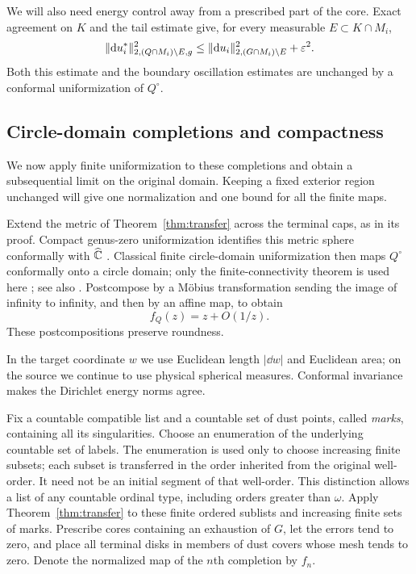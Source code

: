 We will also need energy control away from a prescribed part of the
core.  Exact agreement on $K$ and the tail estimate give, for every
measurable $E\subset K\cap M_i$,
\begin{equation}\label{eq:transfer-localized-energy}
 \|\mathrm d u_i^*\|_{2,(Q\cap M_i)\setminus E,g}^2
 \le \|\mathrm d u_i\|_{2,(G\cap M_i)\setminus E}^2+\varepsilon^2.
\end{equation}
Both this estimate and the boundary oscillation estimates are unchanged
by a conformal uniformization of $Q^\circ$.

\subsection{Circle-domain completions and compactness}

We now apply finite uniformization to these completions and obtain a
subsequential limit on the original domain.  Keeping a fixed exterior
region unchanged will give one normalization and one bound for all
the finite maps.

Extend the metric of Theorem~\ref{thm:transfer} across the terminal
caps, as in its proof.  Compact genus-zero uniformization identifies
this metric sphere conformally with $\widehat{\mathbb C}$
\cite[Theorem~10-3]{Ahlfors1973}.  Classical finite
circle-domain uniformization then maps $Q^\circ$ conformally onto a
circle domain; only the finite-connectivity theorem is used here
\cite{Koebe1920}; see also \cite[Theorem~15.7.9]{Conway1995}.
Postcompose by a M\"obius transformation sending the image of infinity
to infinity, and then by an affine map, to obtain
\begin{equation}\label{eq:transfer-normalization}
 f_Q(z)=z+O(1/z).
\end{equation}
These postcompositions preserve roundness.

In the target coordinate $w$ we use Euclidean length $|\dd w|$ and
Euclidean area; on the source we continue to use physical spherical
measures.  Conformal invariance makes the Dirichlet energy norms agree.

Fix a countable compatible list and a countable set of dust points,
called \emph{marks}, containing all its singularities.  Choose an enumeration of the underlying countable set of labels.
The enumeration is used only to choose increasing finite subsets;
each subset is transferred in the order inherited from the original
well-order.  It need not be an initial segment of that well-order.
This distinction allows a list of any countable ordinal type, including
orders greater than $\omega$.  Apply
Theorem~\ref{thm:transfer} to these finite ordered sublists and
increasing finite sets of marks.  Prescribe cores containing an exhaustion of
$G$, let the errors tend to zero, and place all terminal disks in
members of dust covers whose mesh tends to zero.  Denote the normalized
map of the $n$th completion by $f_n$.

